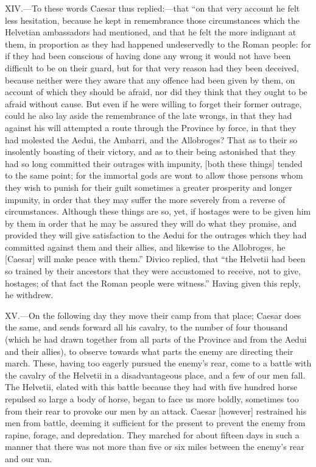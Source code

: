 XIV.—To these words Caesar thus replied:—that ``on that very account he
felt less hesitation, because he kept in remembrance those circumstances
which the Helvetian ambassadors had mentioned, and that he felt the more
indignant at them, in proportion as they had happened undeservedly to
the Roman people: for if they had been conscious of having done any
wrong it would not have been difficult to be on their guard, but for
that very reason had they been deceived, because neither were they aware
that any offence had been given by them, on account of which they should
be afraid, nor did they think that they ought to be afraid without
cause. But even if he were willing to forget their former outrage, could
he also lay aside the remembrance of the late wrongs, in that they had
against his will attempted a route through the Province by force, in
that they had molested the Aedui, the Ambarri, and the Allobroges? That
as to their so insolently boasting of their victory, and as to their
being astonished that they had so long committed their outrages with
impunity, [both these things] tended to the same point; for the immortal
gods are wont to allow those persons whom they wish to punish for their
guilt sometimes a greater prosperity and longer impunity, in order that
they may suffer the more severely from a reverse of circumstances.
Although these things are so, yet, if hostages were to be given him by
them in order that he may be assured they will do what they promise, and
provided they will give satisfaction to the Aedui for the outrages which
they had committed against them and their allies, and likewise to the
Allobroges, he [Caesar] will make peace with them.'' Divico replied, that
``the Helvetii had been so trained by their ancestors that they were
accustomed to receive, not to give, hostages; of that fact the Roman
people were witness.'' Having given this reply, he withdrew.

XV.—On the following day they move their camp from that place; Caesar
does the same, and sends forward all his cavalry, to the number of four
thousand (which he had drawn together from all parts of the Province and
from the Aedui and their allies), to observe towards what parts the
enemy are directing their march. These, having too eagerly pursued the
enemy's rear, come to a battle with the cavalry of the Helvetii in a
disadvantageous place, and a few of our men fall. The Helvetii, elated
with this battle because they had with five hundred horse repulsed so
large a body of horse, began to face us more boldly, sometimes too from
their rear to provoke our men by an attack. Caesar [however] restrained
his men from battle, deeming it sufficient for the present to prevent
the enemy from rapine, forage, and depredation. They marched for about
fifteen days in such a manner that there was not more than five or six
miles between the enemy's rear and our van.

